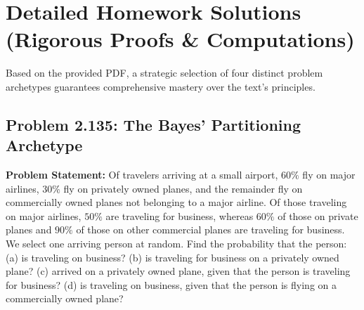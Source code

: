 \documentclass[11pt]{article}
\theoremstyle{definition}
\theoremstyle{plain}
\theoremstyle{remark}
\newcommand{\1}{\mathbf{1}}
\begin{document}
\section{Detailed Homework Solutions (Rigorous Proofs \& Computations)}
Based on the provided PDF, a strategic selection of four distinct problem archetypes guarantees comprehensive mastery over the text's principles. 

\subsection{Problem 2.135: The Bayes' Partitioning Archetype}
\textbf{Problem Statement:} 
Of travelers arriving at a small airport, $60\%$ fly on major airlines, $30\%$ fly on privately owned planes, and the remainder fly on commercially owned planes not belonging to a major airline. Of those traveling on major airlines, $50\%$ are traveling for business, whereas $60\%$ of those on private planes and $90\%$ of those on other commercial planes are traveling for business. We select one arriving person at random. Find the probability that the person:
(a) is traveling on business?
(b) is traveling for business on a privately owned plane?
(c) arrived on a privately owned plane, given that the person is traveling for business?
(d) is traveling on business, given that the person is flying on a commercially owned plane?
\end{document}
